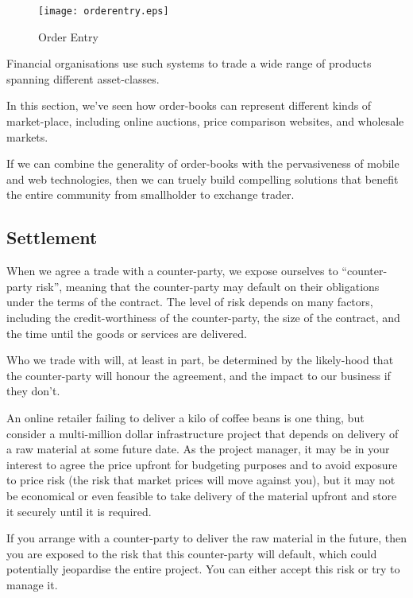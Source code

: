 \documentclass[11pt,a4paper]{article}
\begin{document}
\begin{figure}[H]
\centering
\texttt{[image: orderentry.eps]}
\caption{Order Entry}
\end{figure}

Financial organisations use such systems to trade a wide range of products spanning different
\gls{asset}-classes.

In this section, we've seen how \glspl{order-book} can represent different kinds of
\gls{market-place}, including online \glspl{auction}, price comparison websites, and wholesale
\glspl{market}.

If we can combine the generality of \glspl{order-book} with the pervasiveness of mobile and
\gls{web} technologies, then we can truely build compelling solutions that benefit the entire
community from smallholder to \gls{exchange} trader.

\subsection{Settlement}

When we agree a trade with a counter-party, we expose ourselves to ``counter-party risk'', meaning
that the counter-party may default on their obligations under the terms of the contract. The level
of risk depends on many factors, including the credit-worthiness of the counter-party, the size of
the contract, and the time until the goods or services are delivered.

Who we trade with will, at least in part, be determined by the likely-hood that the counter-party
will honour the agreement, and the impact to our business if they don't.

An online retailer failing to deliver a kilo of coffee beans is one thing, but consider a
multi-million dollar infrastructure project that depends on delivery of a raw material at some
future date. As the project manager, it may be in your interest to agree the price upfront for
budgeting purposes and to avoid exposure to price risk (the risk that market prices will move
against you), but it may not be economical or even feasible to take delivery of the material upfront
and store it securely until it is required.

If you arrange with a counter-party to deliver the raw material in the future, then you are exposed
to the risk that this counter-party will default, which could potentially jeopardise the entire
project. You can either accept this risk or try to manage it.
\end{document}
